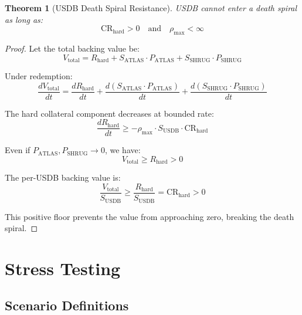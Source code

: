 \documentclass[11pt,a4paper]{article}
\newtheorem{theorem}{Theorem}[section]
\begin{document}
\begin{theorem}[USDB Death Spiral Resistance]
USDB cannot enter a death spiral as long as:
\begin{equation}
\text{CR}_{\text{hard}} > 0 \quad \text{and} \quad \rho_{\max} < \infty
\end{equation}
\end{theorem}

\begin{proof}
Let the total backing value be:
\begin{equation}
V_{\text{total}} = R_{\text{hard}} + S_{\text{ATLAS}} \cdot P_{\text{ATLAS}} + S_{\text{SHRUG}} \cdot P_{\text{SHRUG}}
\end{equation}

Under redemption:
\begin{equation}
\frac{dV_{\text{total}}}{dt} = \frac{dR_{\text{hard}}}{dt} + \frac{d(S_{\text{ATLAS}} \cdot P_{\text{ATLAS}})}{dt} + \frac{d(S_{\text{SHRUG}} \cdot P_{\text{SHRUG}})}{dt}
\end{equation}

The hard collateral component decreases at bounded rate:
\begin{equation}
\frac{dR_{\text{hard}}}{dt} \geq -\rho_{\max} \cdot S_{\text{USDB}} \cdot \text{CR}_{\text{hard}}
\end{equation}

Even if $P_{\text{ATLAS}}, P_{\text{SHRUG}} \to 0$, we have:
\begin{equation}
V_{\text{total}} \geq R_{\text{hard}} > 0
\end{equation}

The per-USDB backing value is:
\begin{equation}
\frac{V_{\text{total}}}{S_{\text{USDB}}} \geq \frac{R_{\text{hard}}}{S_{\text{USDB}}} = \text{CR}_{\text{hard}} > 0
\end{equation}

This positive floor prevents the value from approaching zero, breaking the death spiral.
\end{proof}

\section{Stress Testing}
\label{sec:stresstest}

\subsection{Scenario Definitions}
\end{document}
